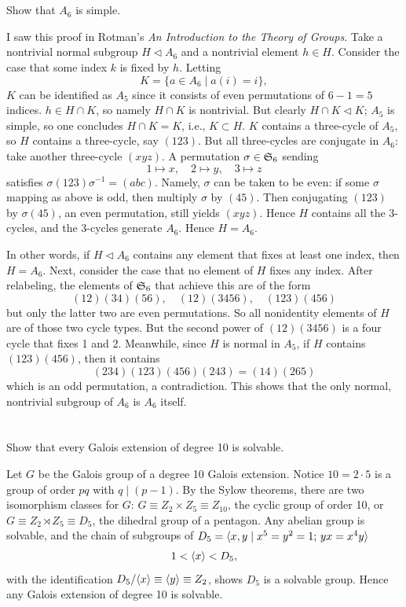 \documentclass[12pt]{article}
\begin{document}
\section{} 
Show that $A_6$ is simple. 

\noindent\dotfill 

I saw this proof in Rotman's \textit{An Introduction to the Theory of Groups}. 
Take a nontrivial normal subgroup $H \lhd A_6$ and a nontrivial element $h \in H$. 
Consider the case that some index $k$ is fixed by $h$. 
Letting 
$$K = \{a \in A_6 \mid a(i) = i\},$$
$K$ can be identified as $A_5$ since it consists of even permutations of $6 - 1 = 5$ indices. 
$h \in H \cap K$, so namely $H \cap K$ is nontrivial. 
But clearly $H \cap K \lhd K$; 
$A_5$ is simple, so one concludes $H \cap K = K$, i.e., $K \subset H$. 
$K$ contains a three-cycle of $A_5$, so $H$ contains a three-cycle, say $(123)$.
But all three-cycles are conjugate in $A_6$: 
take another three-cycle $(xyz)$. 
A permutation $\sigma \in \mathfrak{S}_{6}$ sending 
$$1 \mapsto x, \quad 2 \mapsto y, \quad 3 \mapsto z$$ 
satisfies $\sigma (123) \sigma^{-1} = (abc)$. 
Namely, $\sigma$ can be taken to be even: 
if some $\sigma$ mapping as above is odd, then multiply $\sigma$ by $(45)$. 
Then conjugating $(123)$ by $\sigma (45)$, an even permutation, still yields $(xyz)$. 
Hence $H$ contains all the 3-cycles, and the 3-cycles generate $A_6$. 
Hence $H = A_6$. 

In other words, if $H \lhd A_6$ contains any element that fixes at least one index, then $H = A_6$. 
Next, consider the case that no element of $H$ fixes any index. 
After relabeling, the elements of $\mathfrak{S}_{6}$ that achieve this are of the form 
$$(12)(34)(56), \quad (12)(3456), \quad (123)(456)$$
but only the latter two are even permutations. 
So all nonidentity elements of $H$ are of those two cycle types. 
But the second power of $(12)(3456)$ is a four cycle that fixes 1 and 2. 
Meanwhile, since $H$ is normal in $A_5$, if $H$ contains $(123)(456)$, then it contains 
$$(234) (123)(456) (243) = (14)(265)$$
which is an odd permutation, a contradiction. 
This shows that the only normal, nontrivial subgroup of $A_6$ is $A_6$ itself. 

\section{} 
Show that every Galois extension of degree 10 is solvable. 

\noindent \dotfill 

Let $G$ be the Galois group of a degree 10 Galois extension. 
Notice $10 = 2 \cdot 5$ is a group of order $pq$ with $q \mid (p - 1)$. 
By the Sylow theorems, there are two isomorphism classes for $G$: 
$G \equiv Z_2 \times Z_5 \equiv Z_{10}$, the cyclic group of order 10, or $G \equiv Z_2 \rtimes Z_5 \equiv D_5$, the dihedral group of a pentagon. 
Any abelian group is solvable, and the chain of subgroups of $D_5 = \langle x, y \mid x^5 = y^2 = 1; \, yx = x^4 y\rangle$ 
$$1 < \langle x\rangle < D_5,$$
with the identification $D_5 / \<x\> \equiv \<y\> \equiv Z_2$, shows $D_5$ is a solvable group. 
Hence any Galois extension of degree 10 is solvable. 
\end{document}
